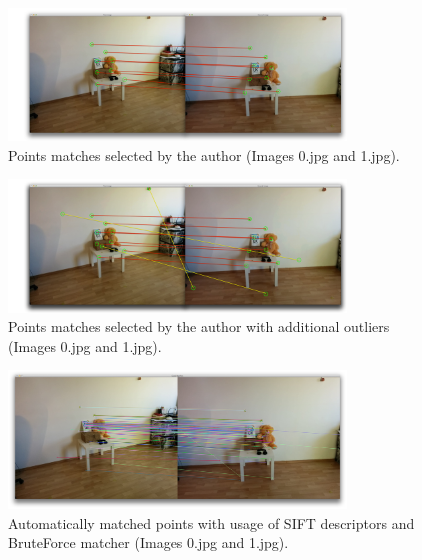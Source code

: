 \begin{figure}[h!]
    \centering
    \includegraphics[width=0.8\textwidth]{01_matching}
    \caption{Points matches selected by the author (Images 0.jpg and 1.jpg).}
    \label{fig:01_matching}
\end{figure}
\begin{figure}[h!]
    \centering
    \includegraphics[width=0.8\textwidth]{01_matching_outliers}
    \caption{Points matches selected by the author with additional outliers (Images 0.jpg and 1.jpg).}
    \label{fig:01_matching_outliers}
\end{figure}
\begin{figure}[h!]
    \centering
    \includegraphics[width=0.8\textwidth]{f_01_auto_sift}
    \caption{Automatically matched points with usage of SIFT descriptors and BruteForce matcher (Images 0.jpg and 1.jpg).}
    \label{fig:f_01_auto_sift}
\end{figure}

